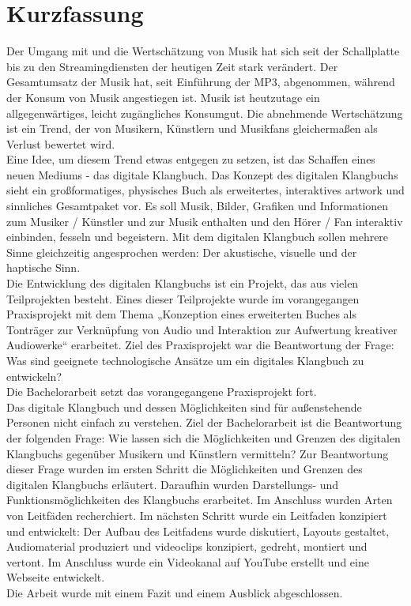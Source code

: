 
\chapter*{Kurzfassung}

Der Umgang mit und die Wertschätzung von Musik hat sich seit der Schallplatte bis zu den Streamingdiensten der heutigen Zeit stark verändert. Der Gesamtumsatz der Musik hat, seit Einführung der MP3, abgenommen, während der Konsum von Musik angestiegen ist.\cite{Musik2014} Musik ist heutzutage ein allgegenwärtiges, leicht zugängliches Konsumgut. Die abnehmende Wertschätzung ist ein Trend, der von Musikern, Künstlern und Musikfans gleichermaßen als Verlust bewertet wird.\cite{K01}\cite{Lost}\\

Eine Idee, um diesem Trend etwas entgegen zu setzen, ist das Schaffen eines neuen Mediums - das digitale Klangbuch. Das Konzept des digitalen Klangbuchs sieht ein großformatiges, physisches Buch als erweitertes, interaktives \gls{artwork} und sinnliches Gesamtpaket vor. Es soll Musik, Bilder, Grafiken und Informationen zum Musiker / Künstler und zur Musik enthalten und den Hörer / Fan interaktiv einbinden, fesseln und begeistern. Mit dem digitalen Klangbuch sollen mehrere Sinne gleichzeitig angesprochen werden: Der akustische, visuelle und der haptische Sinn.\\

Die Entwicklung des digitalen Klangbuchs ist ein Projekt, das aus vielen Teilprojekten besteht. Eines dieser Teilprojekte wurde im vorangegangen Praxisprojekt mit dem Thema „Konzeption eines erweiterten Buches als Tonträger zur Verknüpfung von Audio und Interaktion zur Aufwertung kreativer Audiowerke“ erarbeitet. Ziel des Praxisprojekt war die Beantwortung der Frage: Was sind geeignete technologische Ansätze um ein digitales Klangbuch zu entwickeln?\\

Die Bachelorarbeit setzt das vorangegangene Praxisprojekt fort.\\
Das digitale Klangbuch und dessen Möglichkeiten sind für außenstehende Personen nicht einfach zu verstehen. Ziel der Bachelorarbeit ist die Beantwortung der folgenden Frage: Wie lassen sich die Möglichkeiten und Grenzen des digitalen Klangbuchs gegenüber Musikern und Künstlern vermitteln? Zur Beantwortung dieser Frage wurden im ersten Schritt die Möglichkeiten und Grenzen des digitalen Klangbuchs erläutert. Daraufhin wurden Darstellungs- und Funktionsmöglichkeiten des Klangbuchs erarbeitet. Im Anschluss wurden Arten von Leitfäden recherchiert. Im nächsten Schritt wurde ein Leitfaden konzipiert und entwickelt: Der Aufbau des Leitfadens wurde diskutiert, Layouts gestaltet, Audiomaterial produziert und \gls{videoclip}s konzipiert, gedreht, montiert und vertont. Im Anschluss wurde ein Videokanal auf YouTube erstellt und eine Webseite entwickelt.\\

Die Arbeit wurde mit einem Fazit und einem Ausblick abgeschlossen.

